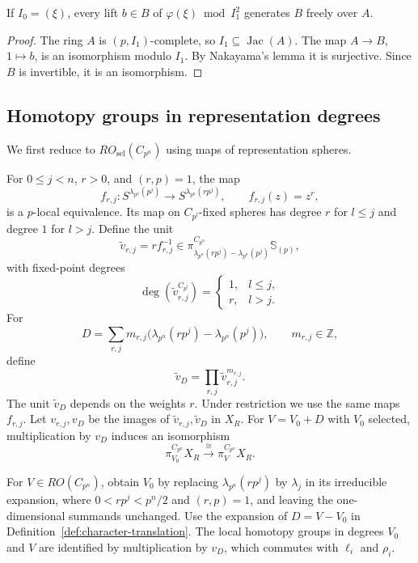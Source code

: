 \begin{proposition}\label{lem:period-repair-frame}
If $I_0=(\xi)$, every lift $b\in B$ of
$\varphi(\xi)\bmod I_1^2$ generates $B$ freely over $A$.
\end{proposition}
\begin{proof}
The ring $A$ is $(p,I_1)$-complete, so $I_1\subseteq\operatorname{Jac}(A)$.
The map $A\to B$, $1\mapsto b$, is an isomorphism modulo $I_1$.
By Nakayama's lemma it is surjective. Since $B$ is invertible, it is
an isomorphism.
\end{proof}

\subsection{Homotopy groups in representation degrees}
We first reduce to $RO_{\mathrm{sel}}(C_{p^n})$
using maps of representation spheres.

\begin{definition}\label{def:character-translation}
For $0\le j<n$, $r>0$, and $(r,p)=1$, the map
\[
f_{r,j}:S^{\lambda_{p^n}(p^j)}
\longrightarrow S^{\lambda_{p^n}(rp^j)},
\qquad f_{r,j}(z)=z^r,
\]
is a $p$-local equivalence. Its map on $C_{p^l}$-fixed spheres has
degree $r$ for $l\le j$ and degree $1$ for $l>j$. Define the unit
\[
\widetilde v_{r,j}=r f_{r,j}^{-1}
\in
\pi_{\lambda_{p^n}(rp^j)-\lambda_{p^n}(p^j)}
^{C_{p^n}}\mathbb S_{(p)},
\]
with fixed-point degrees
\[
\deg(\widetilde v_{r,j}^{C_{p^l}})
=
\begin{cases}
1,&l\le j,\\
r,&l>j.
\end{cases}
\]
For
\[
D=\sum_{r,j}m_{r,j}
\bigl(\lambda_{p^n}(rp^j)-\lambda_{p^n}(p^j)\bigr),
\qquad m_{r,j}\in\mathbb Z,
\]
define
\[
\widetilde v_D
=\prod_{r,j}\widetilde v_{r,j}^{m_{r,j}}.
\]
The unit $\widetilde v_D$ depends on the weights $r$. Under restriction we use the same maps $f_{r,j}$.
Let $v_{r,j},v_D$ be the images of $\widetilde v_{r,j},\widetilde v_D$ in $X_R$.
For $V=V_0+D$ with $V_0$ selected, multiplication
by $v_D$ induces an isomorphism
\[
\pi_{V_0}^{C_{p^n}}X_R
\xrightarrow{\ \cong\ }
\pi_V^{C_{p^n}}X_R.
\]
\end{definition}

For $V\in RO(C_{p^n})$, obtain $V_0$ by replacing
$\lambda_{p^n}(rp^j)$ by $\lambda_j$ in its irreducible
expansion, where $0<rp^j<p^n/2$ and $(r,p)=1$,
and leaving the one-dimensional summands unchanged.
Use the expansion of $D=V-V_0$ in
Definition~\ref{def:character-translation}.
The local homotopy groups in degrees $V_0$ and $V$ are
identified by multiplication by $v_D$,
which commutes with $\ell_i$ and $\rho_i$.

